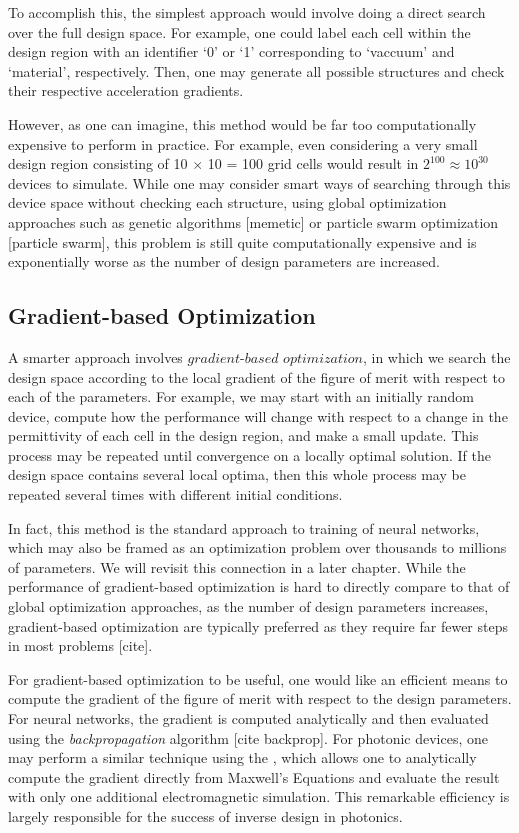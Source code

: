 To accomplish this, the simplest approach would involve doing a direct search over the full design space.  For example, one could label each cell within the design region with an identifier `0' or `1' corresponding to `vaccuum' and `material', respectively.  Then, one may generate all possible structures and check their respective acceleration gradients.

However, as one can imagine, this method would be far too computationally expensive to perform in practice.
For example, even considering a very small design region consisting of 10 $\times$ 10 = 100 grid cells would result in $2^{100} \approx 10^{30}$ devices to simulate.
While one may consider smart ways of searching through this device space without checking each structure, using global optimization approaches such as genetic algorithms [memetic] or particle swarm optimization [particle swarm], this problem is still quite computationally expensive and is exponentially worse as the number of design parameters are increased.

\subsection{Gradient-based Optimization}

A smarter approach involves $\textit{gradient-based optimization}$, in which we search the design space according to the local gradient of the figure of merit with respect to each of the parameters.
For example, we may start with an initially random device, compute how the performance will change with respect to a change in the permittivity of each cell in the design region, and make a small update.
This process may be repeated until convergence on a locally optimal solution.
If the design space contains several local optima, then this whole process may be repeated several times with different initial conditions.

In fact, this method is the standard approach to training of neural networks, which may also be framed as an optimization problem over thousands to millions of parameters.
We will revisit this connection in a later chapter.
While the performance of gradient-based optimization is hard to directly compare to that of global optimization approaches, as the number of design parameters increases, gradient-based optimization are typically preferred as they require far fewer steps in most problems [cite].

For gradient-based optimization to be useful, one would like an efficient means to compute the gradient of the figure of merit with respect to the design parameters.
For neural networks, the gradient is computed analytically and then evaluated using the \textit{backpropagation} algorithm [cite backprop].
For photonic devices, one may perform a similar technique using the , which allows one to analytically compute the gradient directly from Maxwell's Equations and evaluate the result with only one additional electromagnetic simulation.
This remarkable efficiency is largely responsible for the success of inverse design in photonics.

